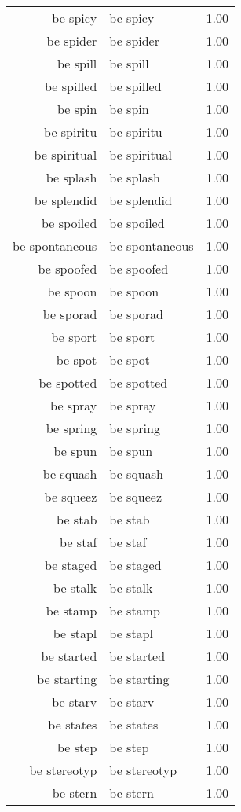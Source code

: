 \begin{table}[ht]
\begin{tabular}{rlr}
  be spicy & be spicy & 1.00 \\ 
  be spider & be spider & 1.00 \\ 
  be spill & be spill & 1.00 \\ 
  be spilled & be spilled & 1.00 \\ 
  be spin & be spin & 1.00 \\ 
  be spiritu & be spiritu & 1.00 \\ 
  be spiritual & be spiritual & 1.00 \\ 
  be splash & be splash & 1.00 \\ 
  be splendid & be splendid & 1.00 \\ 
  be spoiled & be spoiled & 1.00 \\ 
  be spontaneous & be spontaneous & 1.00 \\ 
  be spoofed & be spoofed & 1.00 \\ 
  be spoon & be spoon & 1.00 \\ 
  be sporad & be sporad & 1.00 \\ 
  be sport & be sport & 1.00 \\ 
  be spot & be spot & 1.00 \\ 
  be spotted & be spotted & 1.00 \\ 
  be spray & be spray & 1.00 \\ 
  be spring & be spring & 1.00 \\ 
  be spun & be spun & 1.00 \\ 
  be squash & be squash & 1.00 \\ 
  be squeez & be squeez & 1.00 \\ 
  be stab & be stab & 1.00 \\ 
  be staf & be staf & 1.00 \\ 
  be staged & be staged & 1.00 \\ 
  be stalk & be stalk & 1.00 \\ 
  be stamp & be stamp & 1.00 \\ 
  be stapl & be stapl & 1.00 \\ 
  be started & be started & 1.00 \\ 
  be starting & be starting & 1.00 \\ 
  be starv & be starv & 1.00 \\ 
  be states & be states & 1.00 \\ 
  be step & be step & 1.00 \\ 
  be stereotyp & be stereotyp & 1.00 \\ 
  be stern & be stern & 1.00 \\ 

\end{tabular}
\end{table}

